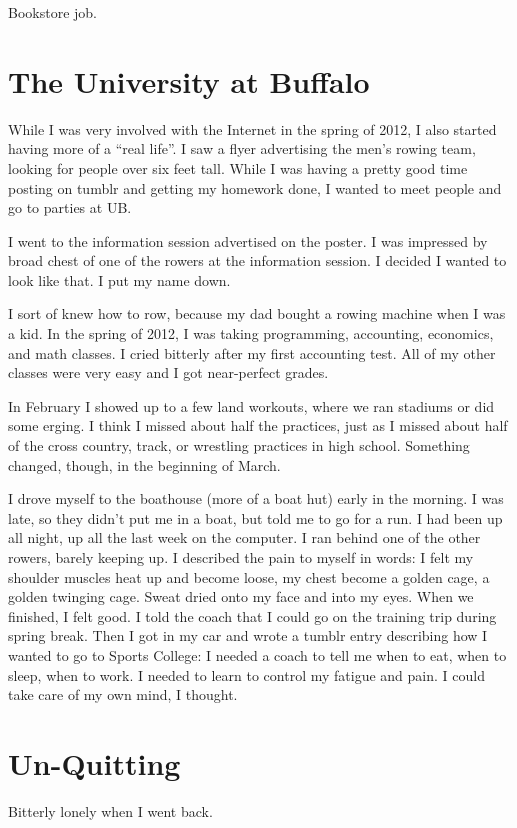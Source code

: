 \documentclass[12pt]{article}
\begin{document}
Bookstore job.

\section{The University at Buffalo}
While I was very involved with the Internet in the spring of 2012, I also
started having more of a ``real life''.  I saw a flyer advertising the men's
rowing team, looking for people over six feet tall.  While I was having a
pretty good time posting on tumblr and getting my homework done, I wanted to
meet people and go to parties at UB. 

I went to the information session advertised on the poster.  I was impressed by
 broad chest of one of the rowers at the information session.  I decided I
wanted to look like that.  I put my name down.

I sort of knew how to row, because my dad bought a rowing machine when I was a
kid.  In the spring of 2012, I was taking programming, accounting, economics, and
math classes.  I cried bitterly after my first accounting test.  All of my
other classes were very easy and I got near-perfect grades.

In February I showed up to a few land workouts, where we ran stadiums or did
some erging.  I think I missed about half the practices, just as I missed about
half of the cross country, track, or wrestling practices in high school.
Something changed, though, in the beginning of March.

I drove myself to the boathouse (more of a boat hut) early in the morning.  I
was late, so they didn't put me in a boat, but told me to go for a run.  I had
been up all night, up all the last week on the computer.  I ran behind one of
the other rowers, barely keeping up.  I described the pain to myself in words: I
felt my shoulder muscles heat up and become loose, my chest become a golden
cage, a golden twinging cage.  Sweat dried onto my face and into my eyes.  When
we finished, I felt good.  I told the coach that I could go on the training trip
during spring break.  Then I got in my car and wrote a tumblr entry describing
how I wanted to go to Sports College: I needed a coach to tell me when to eat,
when to sleep, when to work.  I needed to learn to control my fatigue and pain.
I could take care of my own mind, I thought.


\section{Un-Quitting}
Bitterly lonely when I went back.
\end{document}
